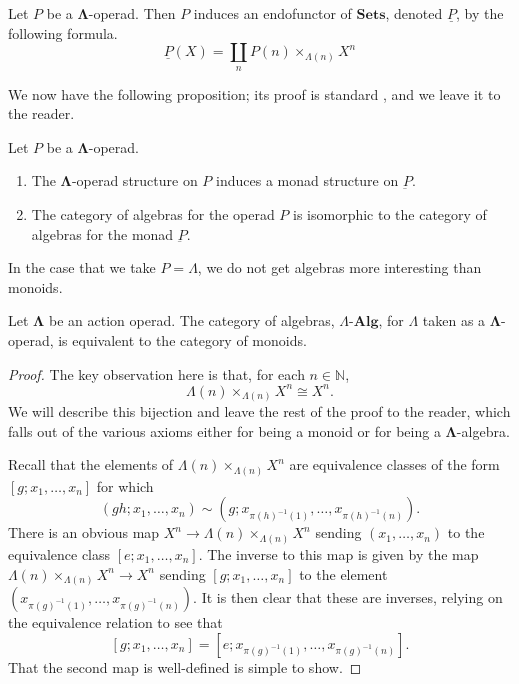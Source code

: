 \documentclass{amsbook} %
\newcommand{\mb}{\mathbf}
\newcommand{\ML}{\mathbf{\Lambda}}
\numberwithin{section}{chapter}
\begin{document}
\begin{Defi}
Let $P$ be a $\ML$-operad.  Then $P$ induces an endofunctor of $\mb{Sets}$, denoted $\underline{P}$, by the following formula.
  \[
	 \underline{P}(X) = \coprod_n P(n) \times_{\Lambda(n)} X^n
  \]
\end{Defi}

We now have the following proposition; its proof is standard \cite{maygeom}, and we leave it to the reader.

\begin{prop}\label{op=monad1}  Let $P$ be a $\ML$-operad.
  \begin{enumerate}
    \item The $\ML$-operad structure on $P$ induces a monad structure on $\underbar{P}$.
    \item The category of algebras for the operad $P$ is isomorphic to the category of algebras for the monad $\underbar{P}$.
  \end{enumerate}
\end{prop}

In the case that we take $P = \Lambda$, we do not get algebras more interesting than monoids.
\begin{prop}
Let $\ML$ be an action operad. The category of algebras, $\Lambda\mbox{-}\mb{Alg}$, for $\Lambda$ taken as a $\ML$-operad, is equivalent to the category of monoids.
\end{prop}
\begin{proof}
The key observation here is that, for each $n \in \mathbb{N}$,
	\[
		\Lambda(n) \times_{\Lambda(n)} X^n \cong X^n.
	\]
We will describe this bijection and leave the rest of the proof to the reader, which falls out of the various axioms either for being a monoid or for being a $\ML$-algebra.

Recall that the elements of $\Lambda(n) \times_{\Lambda(n)} X^n$ are equivalence classes of the form $[g ; x_1, \ldots, x_n]$ for which
	\[
		(gh; x_1, \ldots, x_n) \sim \left(g; x_{\pi(h)^{-1}(1)}, \ldots, x_{\pi(h)^{-1}(n)}\right).
	\]
There is an obvious map $X^n \rightarrow \Lambda(n) \times_{\Lambda(n)} X^n$ sending $(x_1, \ldots, x_n)$ to the equivalence class $[e; x_1, \ldots, x_n]$. The inverse to this map is given by the map $\Lambda(n) \times_{\Lambda(n)} X^n \rightarrow X^n$ sending $[g;x_1,\ldots,x_n]$ to the element $(x_{\pi(g)^{-1}(1)},\ldots,x_{\pi(g)^{-1}(n)})$. It is then clear that these are inverses, relying on the equivalence relation to see that
	\[
		[g;x_1,\ldots,x_n] = \left[e;x_{\pi(g)^{-1}(1)},\ldots,x_{\pi(g)^{-1}(n)}\right].
	\]
That the second map is well-defined is simple to show.
\end{proof}
\end{document}
